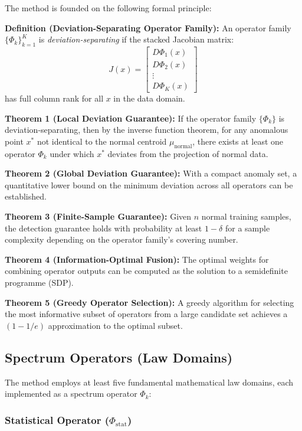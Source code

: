 \documentclass[12pt,a4paper]{article}
\begin{document}
The method is founded on the following formal principle:

\textbf{Definition (Deviation-Separating Operator Family):} An operator 
family $\{\Phi_k\}_{k=1}^{K}$ is \emph{deviation-separating} if the stacked 
Jacobian matrix:
\begin{equation}
J(x) = \begin{bmatrix} D\Phi_1(x) \\ D\Phi_2(x) \\ \vdots \\ 
D\Phi_K(x) \end{bmatrix}
\end{equation}
has full column rank for all $x$ in the data domain.

\textbf{Theorem 1 (Local Deviation Guarantee):} If the operator family 
$\{\Phi_k\}$ is deviation-separating, then by the inverse function theorem, 
for any anomalous point $x^*$ not identical to the normal centroid 
$\mu_{\text{normal}}$, there exists at least one operator $\Phi_k$ under 
which $x^*$ deviates from the projection of normal data.

\textbf{Theorem 2 (Global Deviation Guarantee):} With a compact anomaly set, 
a quantitative lower bound on the minimum deviation across all operators can 
be established.

\textbf{Theorem 3 (Finite-Sample Guarantee):} Given $n$ normal training 
samples, the detection guarantee holds with probability at least 
$1 - \delta$ for a sample complexity depending on the operator family's 
covering number.

\textbf{Theorem 4 (Information-Optimal Fusion):} The optimal weights for 
combining operator outputs can be computed as the solution to a semidefinite 
programme (SDP).

\textbf{Theorem 5 (Greedy Operator Selection):} A greedy algorithm for 
selecting the most informative subset of operators from a large candidate 
set achieves a $(1 - 1/e)$ approximation to the optimal subset.

\subsection{Spectrum Operators (Law Domains)}

The method employs at least five fundamental mathematical law domains, each 
implemented as a spectrum operator $\Phi_k$:

\subsubsection{Statistical Operator ($\Phi_{\text{stat}}$)}
\end{document}

